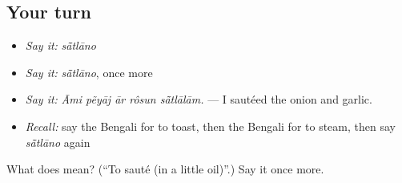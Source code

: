 \subsection*{Your turn}
\begin{itemize}
\raggedright
  \item \emph{Say it:} \emph{sā̃tlāno}
  \item \emph{Say it:} \emph{sā̃tlāno}, once more
  \item \emph{Say it:} \emph{Āmi pẽyāj ār rôsun sā̃tlālām.} — I sautéed the onion and garlic.
  \item \emph{Recall:} say the Bengali for to toast, then the Bengali for to steam, then say \emph{sā̃tlāno} again
\end{itemize}

\begin{tcolorbox}[breakable,colback=teal!4,colframe=teal!35!black,title={Before you move on}]
What does  mean? (\textquotedblleft{}To sauté (in a little oil)\textquotedblright{}.) Say it once more.
\end{tcolorbox}
